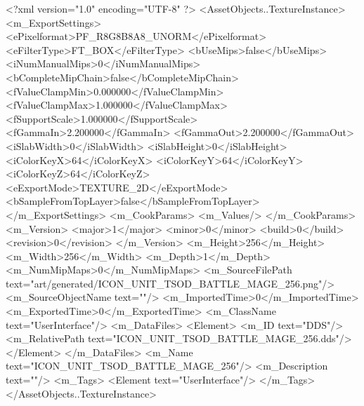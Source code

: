 <?xml version="1.0" encoding="UTF-8" ?>
<AssetObjects..TextureInstance>
	<m_ExportSettings>
		<ePixelformat>PF_R8G8B8A8_UNORM</ePixelformat>
		<eFilterType>FT_BOX</eFilterType>
		<bUseMips>false</bUseMips>
		<iNumManualMips>0</iNumManualMips>
		<bCompleteMipChain>false</bCompleteMipChain>
		<fValueClampMin>0.000000</fValueClampMin>
		<fValueClampMax>1.000000</fValueClampMax>
		<fSupportScale>1.000000</fSupportScale>
		<fGammaIn>2.200000</fGammaIn>
		<fGammaOut>2.200000</fGammaOut>
		<iSlabWidth>0</iSlabWidth>
		<iSlabHeight>0</iSlabHeight>
		<iColorKeyX>64</iColorKeyX>
		<iColorKeyY>64</iColorKeyY>
		<iColorKeyZ>64</iColorKeyZ>
		<eExportMode>TEXTURE_2D</eExportMode>
		<bSampleFromTopLayer>false</bSampleFromTopLayer>
	</m_ExportSettings>
	<m_CookParams>
		<m_Values/>
	</m_CookParams>
	<m_Version>
		<major>1</major>
		<minor>0</minor>
		<build>0</build>
		<revision>0</revision>
	</m_Version>
	<m_Height>256</m_Height>
	<m_Width>256</m_Width>
	<m_Depth>1</m_Depth>
	<m_NumMipMaps>0</m_NumMipMaps>
	<m_SourceFilePath text="art/generated/ICON_UNIT_TSOD_BATTLE_MAGE_256.png"/>
	<m_SourceObjectName text=""/>
	<m_ImportedTime>0</m_ImportedTime>
	<m_ExportedTime>0</m_ExportedTime>
	<m_ClassName text="UserInterface"/>
	<m_DataFiles>
		<Element>
			<m_ID text="DDS"/>
			<m_RelativePath text="ICON_UNIT_TSOD_BATTLE_MAGE_256.dds"/>
		</Element>
	</m_DataFiles>
	<m_Name text="ICON_UNIT_TSOD_BATTLE_MAGE_256"/>
	<m_Description text=""/>
	<m_Tags>
		<Element text="UserInterface"/>
	</m_Tags>
</AssetObjects..TextureInstance>
